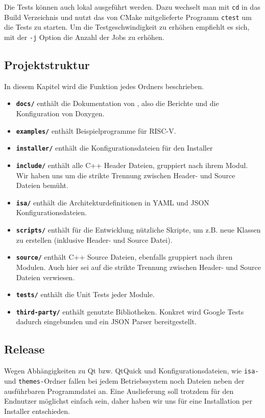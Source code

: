 Die Tests können auch lokal ausgeführt werden. Dazu wechselt man mit \texttt{cd} in das Build
Verzeichnis und nutzt das von CMake mitgelieferte Programm \texttt{ctest} um die Tests zu starten.
Um die Testgeschwindigkeit zu erhöhen empfiehlt es sich, mit der \texttt{-j} Option die Anzahl
der Jobs zu erhöhen.

\subsection{Projektstruktur}

In diesem Kapitel wird die Funktion jedes Ordners beschrieben.

\begin{itemize}
	\item \textbf{\texttt{docs/}} enthält die Dokumentation von \erasim, also
	die Berichte und die Konfiguration von Doxygen.
	\item \textbf{\texttt{examples/}} enthält Beispielprogramme für RISC-V.
	\item \textbf{\texttt{installer/}} enthält die Konfigurationsdateien für den Installer
	\item \textbf{\texttt{include/}} enthält alle C++ Header Dateien, gruppiert
	nach ihrem Modul. Wir haben uns um die strikte Trennung zwischen Header- und
	Source Dateien bemüht.
	\item \textbf{\texttt{isa/}} enthält die Architekturdefinitionen in YAML und
	JSON Konfigurationsdateien.
	\item \textbf{\texttt{scripts/}} enthält für die Entwicklung nützliche
	Skripte, um z.B. neue Klassen zu erstellen (inklusive Header- und
	Source Datei).
	\item \textbf{\texttt{source/}} enthält C++ Source Dateien, ebenfalls
	gruppiert nach ihren Modulen. Auch hier sei auf die strikte Trennung
	zwischen Header- und Source Dateien verwiesen.
	\item \textbf{\texttt{tests/}} enthält die Unit Tests jeder Module.
	\item \textbf{\texttt{third-party/}} enthält genutzte Bibliotheken. Konkret
	wird Google Tests dadurch eingebunden und ein JSON Parser bereitgestellt.
\end{itemize}

\subsection{Release}
Wegen Abhängigkeiten zu Qt bzw. QtQuick und Konfigurationsdateien, wie \texttt{isa-} und \texttt{themes-}Ordner fallen bei jedem Betriebssystem noch Dateien neben der ausführbaren Programmdatei an. Eine Auslieferung soll trotzdem für den Endnutzer möglichst einfach sein, daher haben wir uns für eine Installation per Installer entschieden.

